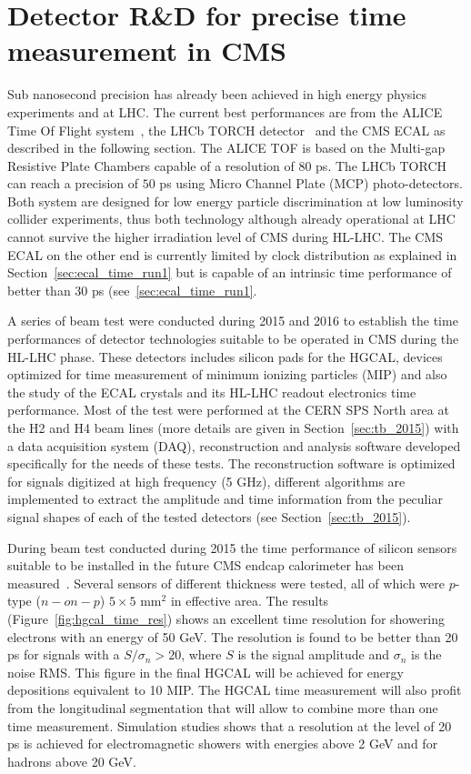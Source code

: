 \section{Detector R\&D for precise time measurement in CMS}
\label{sec:tming_rnd}
Sub nanosecond precision has already been achieved in high energy physics experiments and at LHC.
The current best performances are from the ALICE Time Of Flight system~\cite{alice_tof}, the LHCb TORCH
detector~\cite{lhcb_torch} and the CMS ECAL as described in the following section. The ALICE TOF is
based on the Multi-gap Resistive Plate Chambers capable of a resolution of $80$ ps. The LHCb TORCH
can reach a precision of $50$ ps using Micro Channel Plate (MCP) photo-detectors. Both system are
designed for low energy particle discrimination at low luminosity collider experiments, thus both technology
although already operational at LHC cannot survive the higher irradiation level of CMS during HL-LHC.
The CMS ECAL on the other end is currently limited by clock distribution as explained in Section~\ref{sec:ecal_time_run1}
but is capable of an intrinsic time performance of better than $30$ ps (see~\ref{sec:ecal_time_run1}.

A series of beam test were conducted during 2015 and 2016 to establish the time performances of detector
technologies suitable to be operated in CMS during the HL-LHC phase. These detectors includes silicon
pads for the HGCAL, devices optimized for time measurement of minimum ionizing particles (MIP) and also the study of
the ECAL \PbWO crystals and its HL-LHC readout electronics time performance. Most of the test were performed at
the CERN SPS North area at the H2 and H4 beam lines (more details are given in Section~\ref{sec:tb_2015}) with
a data acquisition system (DAQ), reconstruction and analysis software developed specifically for the needs of
these tests. The reconstruction software is optimized for signals digitized at high frequency (5 GHz),
different algorithms are implemented to extract the amplitude and time information from the peculiar signal shapes of
each of the tested detectors (see Section~\ref{sec:tb_2015}).

During beam test conducted during 2015 the time performance of silicon sensors suitable to be installed
in the future CMS endcap calorimeter has been measured~\cite{hgcal_tb_time}. Several sensors of different
thickness were tested, all of which were $p$-type ($n-on-p$) $5\times 5$ mm$^2$ in effective area.
The results (Figure~\ref{fig:hgcal_time_res}) shows an excellent time resolution for showering electrons with an
energy of 50 GeV. The resolution is found to be better than 20 ps for signals with a $S/\sigma_n > 20$,  where
$S$ is the signal amplitude and $\sigma_n$ is the noise RMS. This figure in the final HGCAL will be achieved for
energy depositions equivalent to 10 MIP. The HGCAL time measurement will also profit from the longitudinal segmentation that will
allow to combine more than one time measurement. Simulation studies shows that a resolution at the level of 20 ps is
achieved for electromagnetic showers with energies above 2 GeV and for hadrons above 20 GeV.

